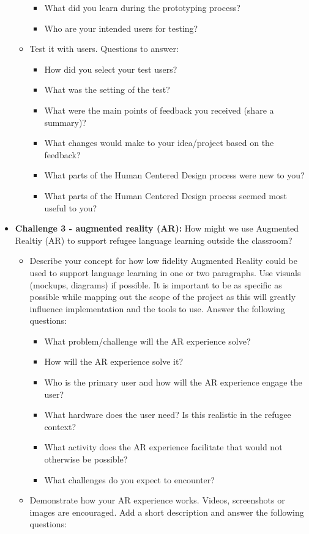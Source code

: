 \documentclass[12pt,twoside]{mitthesis}
\begin{document}
\begin{itemize}
\begin{itemize}
\begin{itemize}
\item What did you learn during the prototyping process?
\item Who are your intended users for testing?
\end{itemize}
\item Test it with users. Questions to answer:
\begin{itemize}
\item How did you select your test users? 
\item What was the setting of the test? 
\item What were the main points of feedback you received (share a summary)? 
\item What changes would make to your idea/project based on the feedback?
\item What parts of the Human Centered Design process were new to you?
\item What parts of the Human Centered Design process seemed most useful to you?
\end{itemize}
\end{itemize}
\item \textbf{Challenge 3 - augmented reality (AR):} How might we use Augmented Realtiy (AR) to support refugee language learning outside the classroom?
\begin{itemize}
\item Describe your concept for how low fidelity Augmented Reality could be used to support language learning in one or two paragraphs. Use visuals (mockups, diagrams) if possible. It is important to be as specific as possible while mapping out the scope of the project as this will greatly influence implementation and the tools to use. Answer the following questions:
\begin{itemize}
\item What problem/challenge will the AR experience solve? 
\item How will the AR experience solve it? 
\item Who is the primary user and how will the AR experience engage the user?
\item What hardware does the user need? Is this realistic in the refugee context? 
\item What activity does the AR experience facilitate that would not otherwise be possible? 
\item What challenges do you expect to encounter? 
\end{itemize}
\item Demonstrate how your AR experience works. Videos, screenshots or images are encouraged. Add a short description and answer the following questions: 

\end{itemize}
\end{itemize}
\end{document}
